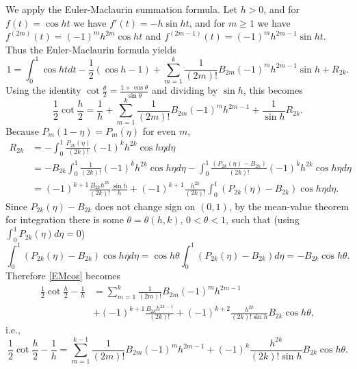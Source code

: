 \documentclass{amsart}
\begin{document}
We apply the Euler-Maclaurin summation formula.
Let $h>0$, and for $f(t)=\cos ht$ we have $f'(t)=-h\sin ht$, and for $m \geq 1$ we have
$f^{(2m)}(t)=(-1)^m h^{2m} \cos ht$ and $f^{(2m-1)}(t)=(-1)^m h^{2m-1} \sin ht$. 
Thus the Euler-Maclaurin formula yields
\[
1 = \int_0^1 \cos ht dt - \frac{1}{2}(\cos h - 1)
+\sum_{m=1}^k \frac{1}{(2m)!} B_{2m} (-1)^m h^{2m-1} \sin h + R_{2k}.
\]
Using the identity $\cot \frac{\theta}{2} = \frac{1+\cos \theta}{\sin \theta}$ and dividing by $\sin h$, this becomes
\begin{equation}
\frac{1}{2} \cot \frac{h}{2} =\frac{1}{h} 
+\sum_{m=1}^k \frac{1}{(2m)!} B_{2m} (-1)^m h^{2m-1} + \frac{1}{\sin h} R_{2k}.
\label{EMcos}
\end{equation}
Because $P_m(1-\eta)=P_m(\eta)$ for even $m$,
\begin{align*}
R_{2k}& = - \int_0^1 \frac{P_{2k}(\eta)}{(2k)!}(-1)^k h^{2k} \cos h\eta d\eta\\
&=- B_{2k} \int_0^1 \frac{1}{(2k)!}(-1)^k h^{2k} \cos h\eta d\eta
- \int_0^1 \frac{(P_{2k}(\eta)-B_{2k})}{(2k)!}(-1)^k h^{2k} \cos h\eta d\eta
\\
&=(-1)^{k+1} \frac{B_{2k} h^{2k}}{(2k)!}  \frac{\sin h}{h}
+(-1)^{k+1} \frac{h^{2k}}{(2k)!} \int_0^1 (P_{2k}(\eta)-B_{2k})  \cos h\eta d\eta.
\end{align*}
Since $P_{2k}(\eta)-B_{2k}$ does not change sign on $(0,1)$, by the mean-value theorem for integration there
is some $\theta=\theta(h,k)$, $0<\theta<1$, such that (using 
$\int_0^1 P_{2k}(\eta) d\eta=0$)
\[
 \int_0^1 (P_{2k}(\eta)-B_{2k})  \cos h\eta d\eta=
 \cos h\theta  \int_0^1 (P_{2k}(\eta)-B_{2k}) d\eta 
 =-B_{2k} \cos h\theta.
\]
Therefore \eqref{EMcos} becomes
\begin{align*}
\frac{1}{2} \cot \frac{h}{2} - \frac{1}{h}&=
\sum_{m=1}^k \frac{1}{(2m)!} B_{2m} (-1)^m h^{2m-1}\\
&+(-1)^{k+1} \frac{B_{2k} h^{2k-1}}{(2k)!}+(-1)^{k+2} \frac{h^{2k}}{(2k)! \sin h}B_{2k} \cos h\theta,
\end{align*}
i.e., 
\[
\frac{1}{2} \cot \frac{h}{2} - \frac{1}{h}=
\sum_{m=1}^{k-1} \frac{1}{(2m)!} B_{2m} (-1)^m h^{2m-1}+(-1)^k \frac{h^{2k}}{(2k)! \sin h}B_{2k} \cos h\theta.
\]
\end{document}
